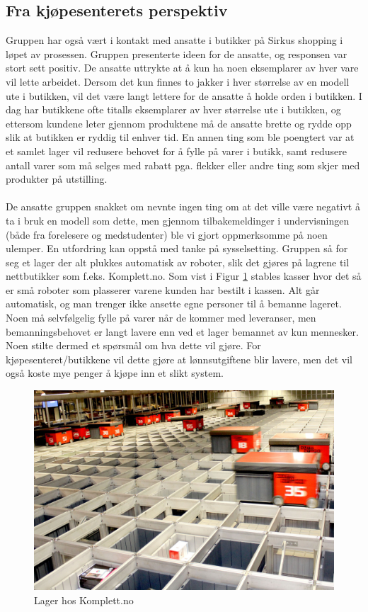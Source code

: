 \subsection{Fra kjøpesenterets perspektiv}
Gruppen har også vært i kontakt med ansatte i butikker på Sirkus shopping i løpet av prosessen. Gruppen presenterte ideen for de ansatte, og responsen var stort sett positiv. De ansatte uttrykte at å kun ha noen eksemplarer av hver vare vil lette arbeidet. Dersom det kun finnes to jakker i hver størrelse av en modell ute i butikken, vil det være langt lettere for de ansatte å holde orden i butikken. I dag har butikkene ofte titalls eksemplarer av hver størrelse ute i butikken, og ettersom kundene leter gjennom produktene må de ansatte brette og rydde opp slik at butikken er ryddig til enhver tid. En annen ting som ble poengtert var at et samlet lager vil redusere behovet for å fylle på varer i butikk, samt redusere antall varer som må selges med rabatt pga. flekker eller andre ting som skjer med produkter på utstilling.
\\\\
De ansatte gruppen snakket om nevnte ingen ting om at det ville være negativt å ta i bruk en modell som dette, men gjennom tilbakemeldinger i undervisningen (både fra forelesere og medstudenter) ble vi gjort oppmerksomme på noen ulemper. En utfordring kan oppstå med tanke på sysselsetting. Gruppen så for seg et lager der alt plukkes automatisk av roboter, slik det gjøres på lagrene til nettbutikker som f.eks. Komplett.no. Som vist i Figur \ref{fig:lager} stables kasser hvor det så er små roboter som plasserer varene kunden har bestilt i kassen. Alt går automatisk, og man trenger ikke ansette egne personer til å bemanne lageret. Noen må selvfølgelig fylle på varer når de kommer med leveranser, men bemanningsbehovet er langt lavere enn ved et lager bemannet av kun mennesker. Noen stilte dermed et spørsmål om hva dette vil gjøre. For kjøpesenteret/butikkene vil dette gjøre at lønnsutgiftene blir lavere, men det vil også koste mye penger å kjøpe inn et slikt system.

\begin{figure}[H]
\includegraphics[scale=0.4]{images/lager}
\centering %
\caption{Lager hos Komplett.no\cite{komplett}}
\label{fig:lager}
\end{figure}

